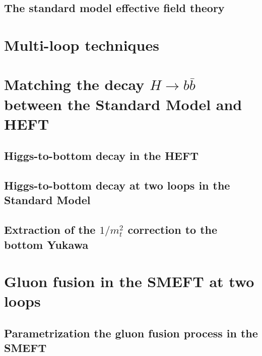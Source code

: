 \documentclass{harvard-thesis}
\begin{document}
\section{The standard model effective field theory}

\chapter{Multi-loop techniques}


\chapter{Matching the decay $H\to b \bar b$ between the Standard Model and HEFT}


\section{Higgs-to-bottom decay in the HEFT}

\section{Higgs-to-bottom decay at two loops in the Standard Model}

\section{Extraction of the $1/m_t^2$ correction to the bottom Yukawa}


\chapter{Gluon fusion in the SMEFT at two loops}
\section{Parametrization the gluon fusion process in the SMEFT}
\end{document}

